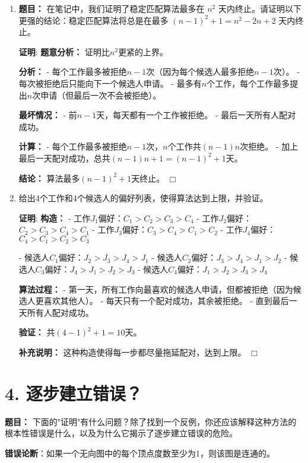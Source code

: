 \documentclass[11pt]{article}
\newenvironment{qparts}{\begin{enumerate}[{(}a{)}]}{\end{enumerate}}
\def\endproofmark{$\Box$}
\newenvironment{proof}{\par{\bf 证明}:}{\endproofmark\smallskip}
\begin{document}
\begin{qparts}
\item \textbf{题目：} 在笔记中，我们证明了稳定匹配算法最多在 $n^{2}$ 天内终止。请证明以下更强的结论：稳定匹配算法将总是在最多 $(n-1)^{2}+1=n^{2}-2n+2$ 天内终止。
\begin{proof}
\textbf{题意分析：} 证明比$n^2$更紧的上界。

\textbf{分析：}
- 每个工作最多被拒绝$n-1$次（因为每个候选人最多拒绝$n-1$次）。
- 每次被拒绝后只能向下一个候选人申请。
- 最多有$n$个工作，每个工作最多提出$n$次申请（但最后一次不会被拒绝）。

\textbf{最坏情况：}
- 前$n-1$天，每天都有一个工作被拒绝。
- 最后一天所有人配对成功。

\textbf{计算：}
- 每个工作最多被拒绝$n-1$次，$n$个工作共$(n-1)n$次拒绝。
- 加上最后一天配对成功，总共$(n-1)n+1=(n-1)^2+1$天。

\textbf{结论：} 算法最多$(n-1)^2+1$天终止。
\end{proof}

\item 给出4个工作和4个候选人的偏好列表，使得算法达到上限，并验证。
\begin{proof}
\textbf{构造：}
- 工作$J_1$偏好：$C_1>C_2>C_3>C_4$
- 工作$J_2$偏好：$C_2>C_3>C_4>C_1$
- 工作$J_3$偏好：$C_3>C_4>C_1>C_2$
- 工作$J_4$偏好：$C_4>C_1>C_2>C_3$

- 候选人$C_1$偏好：$J_2>J_3>J_4>J_1$
- 候选人$C_2$偏好：$J_3>J_4>J_1>J_2$
- 候选人$C_3$偏好：$J_4>J_1>J_2>J_3$
- 候选人$C_4$偏好：$J_1>J_2>J_3>J_4$

\textbf{算法过程：}
- 第一天，所有工作向最喜欢的候选人申请，但都被拒绝（因为候选人更喜欢其他人）。
- 每天只有一个配对成功，其余被拒绝。
- 直到最后一天所有人配对成功。

\textbf{验证：} 共$(4-1)^2+1=10$天。

\textbf{补充说明：} 这种构造使得每一步都尽量拖延配对，达到上限。
\end{proof}
\end{qparts}

\section*{4. 逐步建立错误？}
\textbf{题目：}
下面的"证明"有什么问题？除了找到一个反例，你还应该解释这种方法的根本性错误是什么，以及为什么它揭示了逐步建立错误的危险。

\textbf{错误论断}：如果一个无向图中的每个顶点度数至少为1，则该图是连通的。
\end{document}
